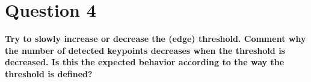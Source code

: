 \section{Question 4}

{\bfseries Try to slowly increase or decrease the (edge) threshold. Comment
why the number of detected keypoints decreases when the threshold is decreased.
Is this the expected behavior according to the way the threshold is defined?}
